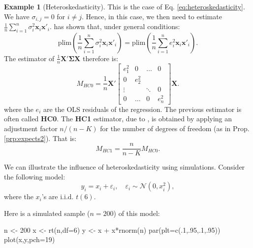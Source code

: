 \documentclass[
  12pt,
]{book}
\newenvironment{Shaded}{\begin{snugshade}}{\end{snugshade}}
\newcommand{\AttributeTok}[1]{\textcolor[rgb]{0.77,0.63,0.00}{#1}}
\newcommand{\DecValTok}[1]{\textcolor[rgb]{0.00,0.00,0.81}{#1}}
\newcommand{\FunctionTok}[1]{\textcolor[rgb]{0.00,0.00,0.00}{#1}}
\newcommand{\NormalTok}[1]{#1}
\newcommand{\OtherTok}[1]{\textcolor[rgb]{0.56,0.35,0.01}{#1}}
\newcommand{\SpecialCharTok}[1]{\textcolor[rgb]{0.00,0.00,0.00}{#1}}
\theoremstyle{definition}
\theoremstyle{definition}
\newtheorem{example}{Example}[chapter]
\theoremstyle{definition}
\theoremstyle{definition}
\theoremstyle{remark}
\begin{document}
\begin{example}[Heteroskedasticity]
\protect\hypertarget{exm:HCheteroskedasticity}{}\label{exm:HCheteroskedasticity}This is the case of Eq. \eqref{eq:heteroskedasticity}. We have \(\sigma_{i,j}=0\) for \(i \ne j\). Hence, in this case, we then need to estimate \(\frac{1}{n}\sum_{i=1}^{n}\sigma_{i}^2\mathbf{x}_i\mathbf{x}'_i\). \citet{White_1980} has shown that, under general conditions:
\begin{equation}
\mbox{plim}\left( \frac{1}{n}\sum_{i=1}^{n}\sigma_{i}^2\mathbf{x}_i\mathbf{x}'_i \right) = 
\mbox{plim}\left( \frac{1}{n}\sum_{i=1}^{n}e_{i}^2\mathbf{x}_i\mathbf{x}'_i \right). \label{eq:white}
\end{equation}
The estimator of \(\frac{1}{n}\mathbf{X}'\boldsymbol\Sigma\mathbf{X}\) therefore is:
\begin{equation}
M_{HC0} = \frac{1}{n}\mathbf{X}'
\left[
\begin{array}{cccc}
e_1^2 & 0 & \dots & 0 \\
0 & e_2^2 &  \\
\vdots & & \ddots&0 \\
0 & \dots & 0 & e_n^2
\end{array}
\right]
\mathbf{X}.\label{eq:White}
\end{equation}
where the \(e_i\) are the OLS residuals of the regression. The previous estimator is often called \textbf{HC0}. The \textbf{HC1} estimator, due to \citet{MacKinnon_White_1985}, is obtained by applying an adjustment factor \(n/(n-K)\) for the number of degrees of freedom (as in Prop. \ref{prp:expects2}). That is:
\begin{equation}
M_{HC1} = \frac{n}{n-K}M_{HC0}.\label{eq:WhiteHC1}
\end{equation}

We can illustrate the influence of heteroskedasticity using simulations. Consider the following model:
\[
y_i = x_i + \varepsilon_i, \quad \varepsilon_i \sim \mathcal{N}(0,x_i^2),
\]
where the \(x_i\)'s are i.i.d. \(t(6)\).

Here is a simulated sample (\(n=200\)) of this model:

\begin{Shaded}
\begin{Highlighting}[]
\NormalTok{n }\OtherTok{\textless{}{-}} \DecValTok{200}
\NormalTok{x }\OtherTok{\textless{}{-}} \FunctionTok{rt}\NormalTok{(n,}\AttributeTok{df=}\DecValTok{6}\NormalTok{)}
\NormalTok{y }\OtherTok{\textless{}{-}}\NormalTok{ x }\SpecialCharTok{+}\NormalTok{ x}\SpecialCharTok{*}\FunctionTok{rnorm}\NormalTok{(n)}
\FunctionTok{par}\NormalTok{(}\AttributeTok{plt=}\FunctionTok{c}\NormalTok{(.}\DecValTok{1}\NormalTok{,.}\DecValTok{95}\NormalTok{,.}\DecValTok{1}\NormalTok{,.}\DecValTok{95}\NormalTok{))}
\FunctionTok{plot}\NormalTok{(x,y,}\AttributeTok{pch=}\DecValTok{19}\NormalTok{)}
\end{Highlighting}
\end{Shaded}


\end{example}
\end{document}
